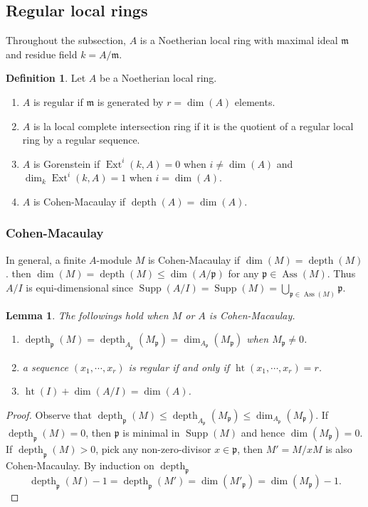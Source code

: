 \documentclass[leqno]{amsart}
\DeclareMathOperator{\hht}{ht}
\DeclareMathOperator{\Supp}{Supp}
\DeclareMathOperator{\Ass}{Ass}
\DeclareMathOperator{\depth}{depth}
\newcommand{\1}{\mathbf{1}}
\newcommand{\fm}{\mathfrak m}
\newcommand{\fp}{\mathfrak p}
\DeclareMathOperator{\Ext}{Ext}
\newtheorem{lem}[thm]{Lemma}
\theoremstyle{definition}
\newtheorem{defn}[thm]{Definition}
\theoremstyle{remark}
\begin{document}
\subsection{Regular local rings}
Throughout the subsection, 
$A$ is a Noetherian local ring
with maximal ideal $\fm$ and residue field  $k=A/\fm$.
\begin{defn}
	Let $A$ be a Noetherian local ring.
	\begin{enumerate}[label=(\alph*)]
	\item 
	$A$ is regular if $\fm$ is generated by 
	$r=\dim(A)$ elements.
	\item 
	$A$ is la local complete intersection ring if
	it is the quotient of a regular local ring by 
	a regular sequence.
	\item 
	$A$ is Gorenstein if
	$\Ext^i(k,A)=0$ when $i\neq \dim(A)$ and
	$\dim_k\Ext^i(k,A)=1$  when $i=\dim(A)$.
	\item 
	$A$ is Cohen-Macaulay if  $\depth(A)=\dim(A)$.
	\end{enumerate}
\end{defn}

\subsubsection{Cohen-Macaulay}

In general, a finite $A$-module  $M$
is Cohen-Macaulay if  $\dim(M)=\depth(M)$.
then $\dim(M)=\depth(M)\leq \dim(A/\fp)$ 
for any $\fp\in \Ass(M)$.
Thus $A/I$ is equi-dimensional since
$\Supp(A/I)=\Supp(M)=\bigcup_{\fp\in\Ass(M)}\fp$.

\begin{lem}
	The followings hold when $M$ or $A$ is Cohen-Macaulay.
	\begin{enumerate}[label=(\alph*)]
		\item $\depth_\fp(M)=\depth_{A_\fp}(M_\fp)=\dim_{A_{\fp}}(M_\fp)$
		when  $M_\fp\neq 0$.
		\item a sequence  $(x_1,\cdots,x_r)$ is regular
		if and only if $\hht(x_1,\cdots,x_r)=r$.
		\item $\hht(I)+\dim(A/I)=\dim(A)$.
	\end{enumerate}
\end{lem}
\begin{proof}
	Observe that 
	$\depth_\fp(M)\leq \depth_{A_\fp}(M_\fp)
	\leq\dim_{A_{\fp}}(M_\fp)$.
	If $\depth_\fp(M)=0$, 
	then $\fp$ is minimal 
	in $\Supp(M)$ and hence $\dim(M_\fp)=0$.
	If $\depth_\fp(M)>0$,
	pick any non-zero-divisor $x\in \fp$,
	then $M'=M/xM$ is also Cohen-Macaulay.
	By induction on $\depth_\fp$
	\[
		 \depth_\fp(M)-1=\depth_\fp(M')=\dim(M'_\fp)=
		 \dim(M_\fp)-1.
	\]

\end{proof}
\end{document}
